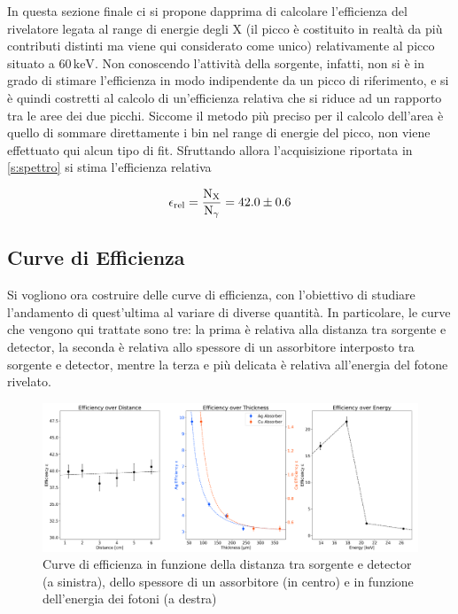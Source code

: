 \documentclass[twocolumn,10pt]{asme2ej}
\begin{document}
In questa sezione finale ci si propone dapprima di calcolare l'efficienza del rivelatore legata al range di energie
degli X (il picco è costituito in realtà da più contributi distinti ma viene qui considerato come unico) relativamente
al picco situato a $60\,\si{\kilo\electronvolt}$. Non conoscendo l'attività della sorgente, infatti, non si è in grado
di stimare l'efficienza in modo indipendente da un picco di riferimento, e si è quindi costretti al calcolo di
un'efficienza relativa che si riduce ad un rapporto tra le aree dei due picchi. Siccome il metodo più preciso per il
calcolo dell'area è quello di sommare direttamente i bin nel range di energie del picco, non viene effettuato qui alcun
tipo di fit. Sfruttando allora l'acquisizione riportata in \autoref{s:spettro} si stima l'efficienza relativa

\vspace{-15pt}
\begin{equation}\label{e:efficienza}
    \epsilon_{\text{rel}} = \frac{\text{N}_{\text{X}}}{\text{N}_{\gamma}} = 42.0 \pm 0.6
    \vspace{-5pt}
\end{equation}

\subsection{Curve di Efficienza}

Si vogliono ora costruire delle curve di efficienza, con l'obiettivo di studiare l'andamento di quest'ultima al variare
di diverse quantità. In particolare, le curve che vengono qui trattate sono tre: la prima è relativa alla distanza tra
sorgente e detector, la seconda è relativa allo spessore di un assorbitore interposto tra sorgente e detector, mentre la
terza e più delicata è relativa all'energia del fotone rivelato. \\

\begin{figure}[t]
    \centering
    \includegraphics[width=\textwidth]{../Plots/efficiency.png}
   \caption{Curve di efficienza in funzione della distanza tra sorgente e detector (a sinistra), dello spessore di un
            assorbitore (in centro) e in funzione dell'energia dei fotoni (a destra)}
    \label{i:efficiency}
\end{figure}
\end{document}
